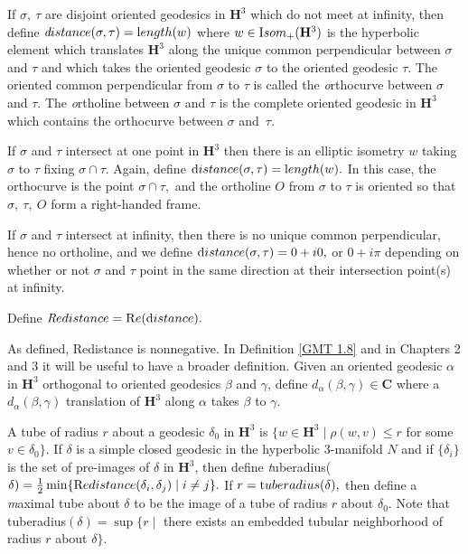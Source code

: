 \begin{definition}\label{GMT 1.4} 
  If $\sigma,\ \tau$ are disjoint oriented geodesics  in 
${\mathbf H}^3$ which do not meet at infinity,
then define
${\textit distance}(\sigma,\tau)={\textrm length}(w)$ where 
$w\in {\textrm Isom}_+({\mathbf H}^3)$ is the hyperbolic
element which translates ${\mathbf H}^3$
along the unique common perpendicular between $\sigma$ and $\tau$ and which takes the
oriented geodesic $\sigma$ to the
oriented geodesic $\tau$.  The oriented common perpendicular from $\sigma$ to $\tau$ is
called the {\textit orthocurve} between $\sigma$
and $\tau$.  The {\textit ortholine} between $\sigma$ and $\tau$ is the complete oriented
geodesic in ${\mathbf H}^3$ which contains the
orthocurve between $\sigma$ and~$\tau$.

If $\sigma$ and $\tau$ intersect at one point in ${\mathbf H}^3$ then 
there is an elliptic isometry $w$ taking $\sigma$ to $\tau$ fixing $\sigma \cap \tau.$  Again,  define ${\textrm distance}(\sigma, \tau) = {\textrm length}(w).$  In this case, the orthocurve is the point $\sigma \cap \tau,$ and the ortholine $O$ from $\sigma$ to $\tau$ is oriented
so that $\sigma,\ \tau,\ O$ form a right-handed frame.

If $\sigma$ and $\tau$ intersect at infinity, then there is no unique common perpendicular, hence no ortholine, and we define
${\textrm distance}(\sigma,\tau) = 0 + i0,$ or $0 + i\pi$ depending on whether or not $\sigma$ and $\tau$ point in the same direction at their intersection point(s) at infinity.

Define ${\textit Redistance} = {\mathrm Re} ({\textrm distance}).$

As defined, Redistance is nonnegative.
In Definition \ref{GMT 1.8} and in
	Chapters 2 and 3 %
it will be useful to have a broader definition. Given an oriented
geodesic $\alpha$ in ${\mathbf H}^3$ orthogonal to oriented geodesics $\beta$ and $\gamma$, define $d_\alpha(\beta,\gamma) \in {\mathbf C}$ where a
$d_\alpha(\beta,\gamma)$ translation of ${\mathbf H}^3$  along $\alpha$ takes $\beta$ to $\gamma.$
\end{definition}


\begin{definition} \label{GMT 1.6}
A tube of radius $r$ about a geodesic $\delta_0$ in ${\mathbf H}^3$ is 
$\{w \in {\mathbf H}^3 \mid \rho(w, v) \le r$ for some $v \in \delta_0 \}.$    
If $\delta$
is a simple closed geodesic in the hyperbolic $3$-manifold $N$ and if
$\{\delta_i \}$ is the set of pre-images of $\delta$ in ${\mathbf H}^3$, then define
{\textit tuberadius}($\delta)={1 \over 2} \min 
\{{\textrm Redistance}(\delta_i,\delta_j) \mid i\neq j \}.$
If $r = {\textrm tuberadius}(\delta),$ 
then define a {\textit maximal tube} about $\delta$ to be the
image of a tube of radius $r$ about $\delta_0.$  Note that
tuberadius$(\delta)=
\sup\{r \mid $ there exists an embedded tubular neighborhood of
radius $r$ about $\delta \}.$
\end{definition}

